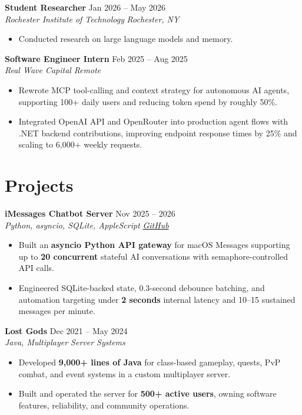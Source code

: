 \documentclass[10pt,letterpaper]{article}
\newif\ifresumeFirstRole
\newcommand{\resumeRole}[4]{%
  \ifresumeFirstRole
    \global\resumeFirstRolefalse
  \else
    \vspace{0pt plus 1fill}%
  \fi
  \textbf{#1} \hfill #2\\
  \textit{#3} \hfill \textit{#4}
}
\begin{document}
\resumeRole{Student Researcher}{Jan 2026 -- May 2026}{Rochester Institute of Technology}{Rochester, NY}
\begin{itemize}
  \item Conducted research on large language models and memory.
\end{itemize}

\resumeRole{Software Engineer Intern}{Feb 2025 -- Aug 2025}{Real Wave Capital}{Remote}
\begin{itemize}
  \item Rewrote MCP tool-calling and context strategy for autonomous AI agents, supporting 100+ daily users and reducing token spend by roughly 50\%.
  \item Integrated OpenAI API and OpenRouter into production agent flows with .NET backend contributions, improving endpoint response times by 25\% and scaling to 6,000+ weekly requests.
\end{itemize}

\section*{Projects}
\resumeRole{iMessages Chatbot Server}{Nov 2025 -- 2026}{Python, asyncio, SQLite, AppleScript}{\href{https://github.com/alextyhwang/iMessages-Chatbot-Server}{GitHub}}
\begin{itemize}
  \item Built an \textbf{asyncio Python API gateway} for macOS Messages supporting up to \textbf{20 concurrent} stateful AI conversations with semaphore-controlled API calls.
  \item Engineered SQLite-backed state, 0.3-second debounce batching, and automation targeting under \textbf{2 seconds} internal latency and 10--15 sustained messages per minute.
\end{itemize}

\resumeRole{Lost Gods}{Dec 2021 -- May 2024}{Java, Multiplayer Server Systems}{ }
\begin{itemize}
  \item Developed \textbf{9,000+ lines of Java} for class-based gameplay, quests, PvP combat, and event systems in a custom multiplayer server.
  \item Built and operated the server for \textbf{500+ active users}, owning software features, reliability, and community operations.
\end{itemize}
\end{document}
